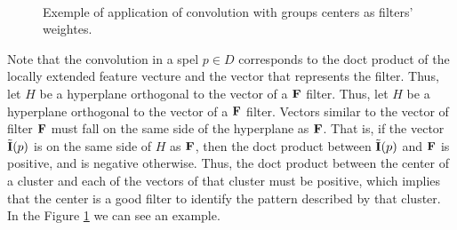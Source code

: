 \documentclass[a4paper,conference]{IEEEtran}
\newcommand{\m}[1]{{\mathrm{\bf #1}}}
\newcommand{\E}{\tilde{\m{I}}}
\newcommand{\mF}{\m{F}}
\begin{document}
\begin{figure}[!t]
  \centering
  \\
  \caption{Exemple of application of convolution with groups centers as filters' weightes.}
  \label{fig:filter}
\end{figure}


Note that the convolution in a spel $p \in D$ corresponds to the doct product of the locally extended feature vecture and the vector that represents the filter. Thus, let $H$ be a hyperplane orthogonal to the vector of a $\mF$ filter. Thus, let $ H $ be a hyperplane orthogonal to the vector of a $ \mF$ filter. Vectors similar to the vector of filter $\mF$ must fall on the same side of the hyperplane as $\mF$. That is, if the vector $\E(p)$ is on the same side of $H$ as $\mF$, then the doct product between $\E (p)$ and $\mF$ is positive, and is negative otherwise. Thus, the doct product between the center of a cluster and each of the vectors of that cluster must be positive, which implies that the center is a good filter to identify the pattern described by that cluster. In the Figure \ref{fig:filter} we can see an example.
\end{document}
